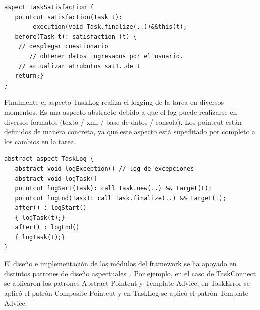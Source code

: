 \begin{verbatim}
aspect TaskSatisfaction {
   pointcut satisfaction(Task t):
        execution(void Task.finalize(..))&&this(t);	
   before(Task t): satisfaction (t) {
	// desplegar cuestionario 
       // obtener datos ingresados por el usuario.
	// actualizar atrubutos sat1..de t
   return;}
}
\end{verbatim}
Finalmente el aspecto TaskLog  realiza el logging de la tarea en diversos momentos. Es una aspecto abstracto debido a que el log puede realizarse en diversos formatos (texto / xml / base de datos / consola). Los pointcut están definidos de manera concreta, ya que este aspecto está supeditado por completo a los cambios en la tarea.  
\begin{verbatim}
abstract aspect TaskLog {
   abstract void logException() // log de excepciones
   abstract void logTask() 
   pointcut logSart(Task): call Task.new(..) && target(t);
   pointcut logEnd(Task): call Task.finalize(..) && target(t);
   after() : logStart()
   { logTask(t);}
   after() : logEnd()
   { logTask(t);}
}
\end{verbatim}
El diseño e implementación de los módulos del framework se ha apoyado en distintos patrones de diseño aspectuales~\cite{HS2003}. Por ejemplo, en el caso de TaskConnect se aplicaron los patrones Abstract Pointcut y Template Advice, en TaskError se aplicó el patrón Composite Pointcut y en TaskLog se aplicó el patrón Template Advice.